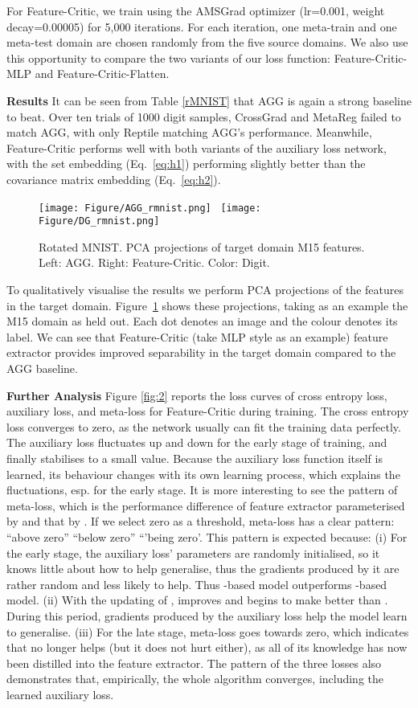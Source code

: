 \documentclass{article}
\newcommand{\modelname}{Feature-Critic}
\newcommand{\keypoint}[1]{\vspace{0.0cm}\noindent\textbf{#1}\quad}
\begin{document}
For \modelname{}, we train using the AMSGrad optimizer (lr=0.001, weight decay=0.00005) for 5,000 iterations. For each iteration, one meta-train and one meta-test domain are chosen randomly from the five source domains. We also use this opportunity to compare the two variants of our loss function: \modelname{}-MLP and \modelname{}-Flatten.

\keypoint{Results} 
It can be seen from Table \ref{rMNIST} that AGG is again a strong baseline to beat. Over ten trials of 1000 digit samples, CrossGrad and MetaReg failed to match AGG, with only Reptile matching AGG's performance. Meanwhile, \modelname{} performs well with both variants of the auxiliary loss network, with the set embedding (Eq.~\ref{eq:h1}) performing slightly better than the covariance matrix embedding (Eq.~\ref{eq:h2}). 


\begin{figure}[tb]
\centering
\texttt{[image: Figure/AGG\_rmnist.png]}~
\texttt{[image: Figure/DG\_rmnist.png]}
\caption{ Rotated MNIST. PCA projections of target domain M15 features. Left: AGG. Right: \modelname{}. Color: Digit.} \label{fig:3}
\end{figure}

To qualitatively visualise the results we perform PCA projections of the features in the target domain. Figure~\ref{fig:3} shows these projections, taking as an example the M15 domain as held out. Each dot denotes an image and the colour denotes its label. We can see that \modelname{} (take MLP style as an example) feature extractor provides improved separability in the target domain compared to the AGG baseline. 

\keypoint{Further Analysis} 
Figure \ref{fig:2} reports the loss curves of cross entropy loss, auxiliary loss, and meta-loss for \modelname{} during training. The cross entropy loss converges to zero, as the network usually can fit the training data perfectly. The auxiliary loss fluctuates up and down for the early stage of training, and finally stabilises to a small value. Because the auxiliary loss function  itself is learned, its behaviour changes with its own learning process, which explains the fluctuations, esp. for the early stage. It is more interesting to see the pattern of meta-loss, which is the performance difference of feature extractor parameterised by  and that by . If we select zero as a threshold, meta-loss has a clear pattern: ``above zero''  ``below zero''  ``'being zero'. This pattern is expected because: (i) For the early stage, the auxiliary loss' parameters are randomly initialised, so it knows little about how to help generalise, thus the gradients produced by it are rather random and less likely to help. Thus -based model outperforms -based model. (ii) With the updating of ,  improves and begins to make  better than . During this period, gradients produced by the auxiliary loss help the model learn to generalise. (iii) For the late stage, meta-loss goes towards zero, which indicates that  no longer helps (but it does not hurt either), as all of its knowledge has now been distilled into the feature extractor. The pattern of the three losses also demonstrates that, empirically, the whole algorithm converges, including the learned auxiliary loss.
\end{document}
